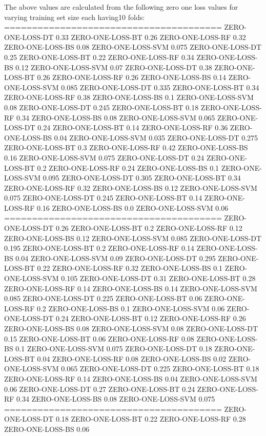 \documentclass[12pt]{article}
\begin{document}
The above values are calculated from the following zero one loss values for varying training
set size each having10 folds:
\\
=======================================
ZERO-ONE-LOSS-DT 0.33
ZERO-ONE-LOSS-BT 0.26
ZERO-ONE-LOSS-RF 0.32
ZERO-ONE-LOSS-BS 0.08
ZERO-ONE-LOSS-SVM 0.075
ZERO-ONE-LOSS-DT 0.25
ZERO-ONE-LOSS-BT 0.22
ZERO-ONE-LOSS-RF 0.34
ZERO-ONE-LOSS-BS 0.12
ZERO-ONE-LOSS-SVM 0.07
ZERO-ONE-LOSS-DT 0.38
ZERO-ONE-LOSS-BT 0.26
ZERO-ONE-LOSS-RF 0.26
ZERO-ONE-LOSS-BS 0.14
ZERO-ONE-LOSS-SVM 0.085
ZERO-ONE-LOSS-DT 0.335
ZERO-ONE-LOSS-BT 0.34
ZERO-ONE-LOSS-RF 0.38
ZERO-ONE-LOSS-BS 0.1
ZERO-ONE-LOSS-SVM 0.08
ZERO-ONE-LOSS-DT 0.245
ZERO-ONE-LOSS-BT 0.18
ZERO-ONE-LOSS-RF 0.34
ZERO-ONE-LOSS-BS 0.08
ZERO-ONE-LOSS-SVM 0.065
ZERO-ONE-LOSS-DT 0.24
ZERO-ONE-LOSS-BT 0.14
ZERO-ONE-LOSS-RF 0.36
ZERO-ONE-LOSS-BS 0.04
ZERO-ONE-LOSS-SVM 0.035
ZERO-ONE-LOSS-DT 0.275
ZERO-ONE-LOSS-BT 0.3
ZERO-ONE-LOSS-RF 0.42
ZERO-ONE-LOSS-BS 0.16
ZERO-ONE-LOSS-SVM 0.075
ZERO-ONE-LOSS-DT 0.24
ZERO-ONE-LOSS-BT 0.2
ZERO-ONE-LOSS-RF 0.24
ZERO-ONE-LOSS-BS 0.1
ZERO-ONE-LOSS-SVM 0.095
ZERO-ONE-LOSS-DT 0.305
ZERO-ONE-LOSS-BT 0.34
ZERO-ONE-LOSS-RF 0.32
ZERO-ONE-LOSS-BS 0.12
ZERO-ONE-LOSS-SVM 0.075
ZERO-ONE-LOSS-DT 0.245
ZERO-ONE-LOSS-BT 0.14
ZERO-ONE-LOSS-RF 0.16
ZERO-ONE-LOSS-BS 0.0
ZERO-ONE-LOSS-SVM 0.06
=======================================
ZERO-ONE-LOSS-DT 0.26
ZERO-ONE-LOSS-BT 0.2
ZERO-ONE-LOSS-RF 0.12
ZERO-ONE-LOSS-BS 0.12
ZERO-ONE-LOSS-SVM 0.085
ZERO-ONE-LOSS-DT 0.195
ZERO-ONE-LOSS-BT 0.2
ZERO-ONE-LOSS-RF 0.14
ZERO-ONE-LOSS-BS 0.04
ZERO-ONE-LOSS-SVM 0.09
ZERO-ONE-LOSS-DT 0.295
ZERO-ONE-LOSS-BT 0.22
ZERO-ONE-LOSS-RF 0.32
ZERO-ONE-LOSS-BS 0.1
ZERO-ONE-LOSS-SVM 0.105
ZERO-ONE-LOSS-DT 0.31
ZERO-ONE-LOSS-BT 0.28
ZERO-ONE-LOSS-RF 0.14
ZERO-ONE-LOSS-BS 0.14
ZERO-ONE-LOSS-SVM 0.085
ZERO-ONE-LOSS-DT 0.225
ZERO-ONE-LOSS-BT 0.06
ZERO-ONE-LOSS-RF 0.2
ZERO-ONE-LOSS-BS 0.1
ZERO-ONE-LOSS-SVM 0.06
ZERO-ONE-LOSS-DT 0.24
ZERO-ONE-LOSS-BT 0.12
ZERO-ONE-LOSS-RF 0.26
ZERO-ONE-LOSS-BS 0.08
ZERO-ONE-LOSS-SVM 0.08
ZERO-ONE-LOSS-DT 0.15
ZERO-ONE-LOSS-BT 0.06
ZERO-ONE-LOSS-RF 0.08
ZERO-ONE-LOSS-BS 0.1
ZERO-ONE-LOSS-SVM 0.075
ZERO-ONE-LOSS-DT 0.18
ZERO-ONE-LOSS-BT 0.04
ZERO-ONE-LOSS-RF 0.08
ZERO-ONE-LOSS-BS 0.02
ZERO-ONE-LOSS-SVM 0.065
ZERO-ONE-LOSS-DT 0.225
ZERO-ONE-LOSS-BT 0.18
ZERO-ONE-LOSS-RF 0.14
ZERO-ONE-LOSS-BS 0.04
ZERO-ONE-LOSS-SVM 0.06
ZERO-ONE-LOSS-DT 0.27
ZERO-ONE-LOSS-BT 0.24
ZERO-ONE-LOSS-RF 0.34
ZERO-ONE-LOSS-BS 0.08
ZERO-ONE-LOSS-SVM 0.075
=======================================
ZERO-ONE-LOSS-DT 0.18
ZERO-ONE-LOSS-BT 0.22
ZERO-ONE-LOSS-RF 0.28
ZERO-ONE-LOSS-BS 0.06
\end{document}

